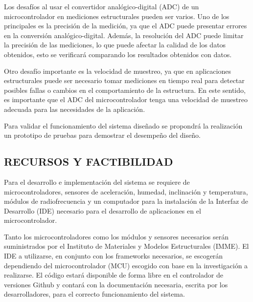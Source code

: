 \documentclass[12pt,letterpaper]{article}
\newcommand{\newfig}[4]{%
\begin{figure}[H]%
\centering%
\texttt{[image: \#2]}%
\caption{\emph{\small{#3}}}%
\label{fig:#4}
\end{figure}%
}
\begin{document}
Los desafíos al usar el convertidor analógico-digital (ADC) de un microcontrolador en mediciones estructurales pueden ser varios. Uno de los principales es la precisión de la medición, ya que el ADC puede presentar errores en la conversión analógico-digital. Además, la resolución del ADC puede limitar la precisión de las mediciones, lo que puede afectar la calidad de los datos obtenidos, esto se verificará comparando los resultados obtenidos con datos.

Otro desafío importante es la velocidad de muestreo, ya que en aplicaciones estructurales puede ser necesario tomar mediciones en tiempo real para detectar posibles fallas o cambios en el comportamiento de la estructura. En este sentido, es importante que el ADC del microcontrolador tenga una velocidad de muestreo adecuada para las necesidades de la aplicación.

Para validar el funcionamiento del sistema diseñado se propondrá la realización un prototipo de pruebas para demostrar el desempeño del diseño.





\newpage

\begin{center}
	\section*{ RECURSOS Y FACTIBILIDAD}
\end{center}

Para el desarrollo e implementación del sistema se requiere de microcontroladores, sensores de aceleración, humedad, inclinación y temperatura, módulos de radiofrecuencia y un computador para la instalación de la Interfaz de Desarrollo (IDE) necesario para el desarrollo de aplicaciones en el microcontrolador.

Tanto los microcontroladores como los módulos y sensores necesarios serán suministrados por el Instituto de Materiales y Modelos Estructurales (IMME). El IDE a utilizarse, en conjunto con los frameworks necesarios, se escogerán dependiendo del microcontrolador (MCU) escogido con base en la investigación a realizarse. El código estará disponible de forma libre en el controlador de versiones Github y contará con la documentación necesaria, escrita por los desarrolladores, para el correcto funcionamiento del sistema.
\end{document}
